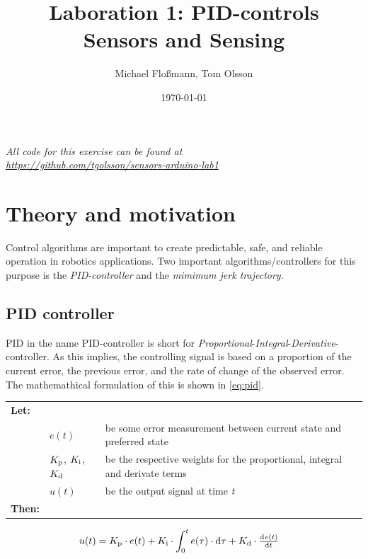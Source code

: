 \documentclass[11pt]{article}
\title{Laboration 1: PID-controls\\ {\small Sensors and Sensing}}
\author{Michael Flo{\ss}mann, Tom Olsson}
\date{\today}
\begin{document}
\maketitle %
\begin{center}
  \emph{All code for this exercise can be found at \\ \url{https://github.com/tgolsson/sensors-arduino-lab1}}
\end{center}
\lstlistoflistings %
\listoffigures %
\listoftables
\lstset{ matchrangestart=t} %
\section{Theory and motivation}
Control algorithms are important to create predictable, safe, and reliable operation in robotics applications. Two important algorithms/controllers for this purpose is the \emph{PID-controller} and the \emph{mimimum jerk trajectory}. 

\subsection{PID controller}
PID in the name PID-controller is short for \emph{Proportional}-\emph{Integral}-\emph{Derivative}-controller. As this implies, the controlling signal is based on a proportion of the current error, the previous error, and the rate of change of the observed error. The mathemathical formulation of this is shown in \vref{eq:pid}.\par \vspace{10pt}
{\footnotesize
  \begin{tabular}{l l l}
    \textbf{Let:} \\
 &$e(t)$ &be some error measurement between current state and preferred state\\
 &$K_\textup{p}$, $K_\textup{i}$, $K_\textup{d}$ &be the respective weights for the proportional, integral and derivate terms \\
 &$u(t)$ &be the output signal at time \emph{t} \\
    \textbf{Then:}
  \end{tabular}
  \begin{align}
    u(t) &= \di{K}{p}\cdot e(t) + \di{K}{i} \cdot\int_{0}^{t}e(\tau)\cdot \dif\tau + \di{K}{d} \cdot \od{e(t)}{t}\label{eq:pid}
  \end{align}}
\par
\end{document}

